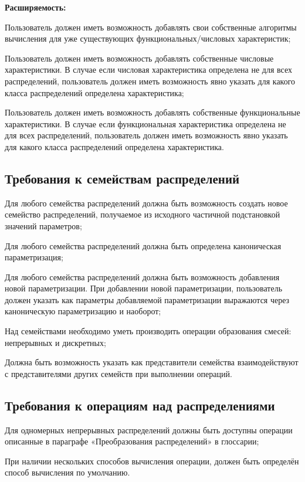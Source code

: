 \textbf{Расширяемость:}
\begin{itemizecmp}
    \item Пользователь должен иметь возможность добавлять свои собственные алгоритмы вычисления для уже существующих функциональных/числовых характеристик;
    \item Пользователь должен иметь возможность добавлять собственные числовые характеристики. В случае если числовая характеристика определена не для всех распределений, пользователь должен иметь возможность явно указать для какого класса распределений определена характеристика;
    \item Пользователь должен иметь возможность добавлять собственные функциональные характеристики. В случае если функциональная характеристика определена не для всех распределений, пользователь должен иметь возможность явно указать для какого класса распределений определена характеристика.
\end{itemizecmp}


\subsection{Требования к семействам распределений}
\begin{itemizecmp}
    \item Для любого семейства распределений должна быть возможность создать новое семейство распределений, получаемое из исходного частичной подстановкой значений параметров;
    \item Для любого семейства распределений должна быть определена каноническая параметризация;
    \item Для любого семейства распределений должна быть возможность добавления новой параметризации. При добавлении новой параметризации, пользователь должен указать как параметры добавляемой параметризации выражаются через каноническую параметризацию и наоборот;
    \item Над семействами необходимо уметь производить операции образования смесей: непрерывных и дискретных;
    \item Должна быть возможность указать как представители семейства взаимодействуют с представителями других семейств при выполнении операций.
\end{itemizecmp}

\subsection{Требования к операциям над распределениями}
\begin{itemizecmp}
    \item Для одномерных непрерывных распределений должны быть доступны операции описанные в параграфе «Преобразования распределений» в глоссарии;
    \item При наличии нескольких способов вычисления операции, должен быть определён способ вычисления по умолчанию.
\end{itemizecmp}

